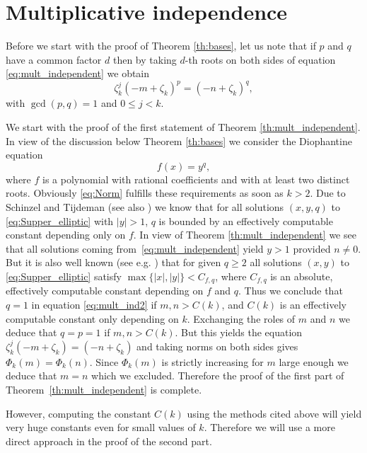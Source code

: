\section{Multiplicative independence}

Before we start with the proof of Theorem \ref{th:bases}, let us note that if $p$ and $q$ have a
common factor $d$ then by taking $d$-th roots on both sides of equation \eqref{eq:mult_independent} we obtain
\begin{equation}\label{eq:mult_ind2}
 \zeta_k^j(-m+\zeta_k)^p=(-n+\zeta_k)^q,
\end{equation}
with  $\gcd(p,q)=1$ and $0\leq j<k$.

We start with the proof of the first statement of Theorem
\ref{th:mult_independent}. In view of the discussion below Theorem \ref{th:bases} we consider the Diophantine
equation
\begin{equation}\label{eq:Supper_elliptic} f(x)=y^q,\end{equation}
where $f$ is a polynomial with rational coefficients and with at least
two distinct roots. Obviously \eqref{eq:Norm} fulfills these
requirements as soon as $k>2$.  Due to Schinzel and Tijdeman
\cite{Schinzel:1976} (see also \cite[Theorem 10.2]{Shorey:Dioph}) we
know that for all solutions $(x,y,q)$ to \eqref{eq:Supper_elliptic}
with $|y|>1$, $q$ is bounded by an effectively computable constant
depending only on $f$. In view of Theorem \ref{th:mult_independent} we
see that all solutions coming from~\eqref{eq:mult_independent} yield
$y>1$ provided $n\neq 0$. But it is also well known (see
e.g. \cite[Theorem 6.1 and 6.2]{Shorey:Dioph}) that for given $q\geq
2$ all solutions $(x,y)$ to \eqref{eq:Supper_elliptic} satisfy
$\max\{|x|,|y|\}<C_{f,q}$, where $C_{f,q}$ is an absolute, effectively
computable constant depending on $f$ and $q$. Thus we conclude that
$q=1$ in equation \eqref{eq:mult_ind2} if $m,n>C(k)$, and $C(k)$ is an
effectively computable constant only depending on $k$. Exchanging the
roles of $m$ and $n$ we deduce that $q=p=1$ if $m,n>C(k)$. But this
yields the equation $\zeta_k^j(-m+\zeta_k)=(-n+\zeta_k)$ and taking
norms on both sides gives $\Phi_k(m)=\Phi_k(n)$. Since $\Phi_k(m)$ is
strictly increasing for $m$ large enough we deduce that $m=n$ which we
excluded. Therefore the proof of the first part of
Theorem~\ref{th:mult_independent} is complete.

However, computing the constant $C(k)$ using the methods cited above
will yield very huge constants even for small values of $k$. Therefore
we will use a more direct approach in the proof of the second part.

